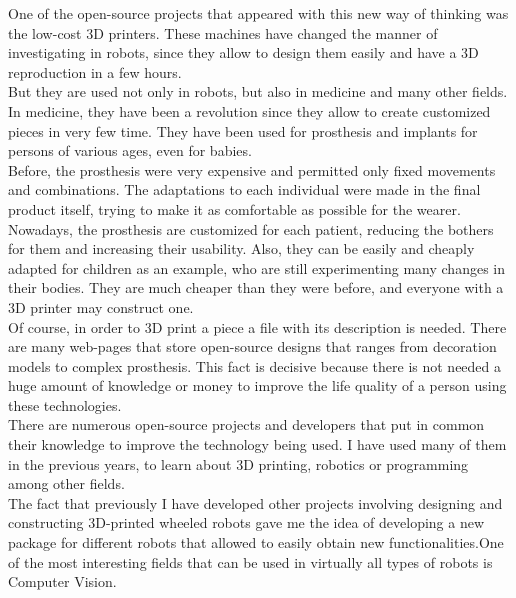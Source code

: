 
One of the open-source projects that appeared with this new way of thinking was the low-cost 3D printers. These machines have changed the manner of investigating in robots, since they allow to design them easily and have a 3D reproduction in a few hours. 
\\

But they are used not only in robots, but also in medicine and many other fields. In medicine, they have been a revolution since they allow to create customized pieces in very few time. They have been used for prosthesis and implants for persons of various ages, even for babies. 
\\

Before, the prosthesis were very expensive and permitted only fixed movements and combinations. The adaptations to each individual were made in the final product itself, trying to make it as comfortable as possible for the wearer. Nowadays, the prosthesis are customized for each patient, reducing the bothers for them and increasing their usability. Also, they can be easily and cheaply adapted for children as an example, who are still experimenting many changes in their bodies. They are much cheaper than they were before, and everyone with a 3D printer may construct one. 
\\

Of course, in order to 3D print a piece a file with its description is needed. There are many web-pages that store open-source designs that ranges from decoration models to complex prosthesis. This fact is decisive because there is not needed a huge amount of knowledge or money to improve the life quality of a person using these technologies. 
\\

There are numerous open-source projects and developers that put in common their knowledge to improve the technology being used. I have used many of them in the previous years, to learn about 3D printing, robotics or programming among other fields. 
\\

The fact that previously I have developed other projects involving designing and constructing 3D-printed wheeled robots gave me the idea of developing a new package for different robots that allowed to easily obtain new functionalities.One of the most interesting fields that can be used in virtually all types of robots is Computer Vision. 
\\

